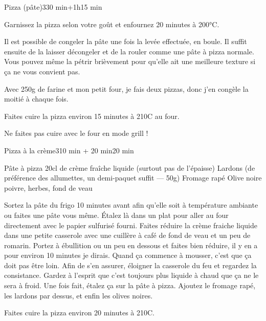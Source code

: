 \begin{recette}{Pizza (pâte)}{3}{30 min+1h}{15 min}
\begin{preparation}
\etape Garnissez la pizza selon votre goût et enfournez 20 minutes à 200°C.
\end{preparation}

\begin{remarque}
Il est possible de congeler la pâte une fois la levée effectuée, en boule. Il suffit ensuite de la laisser décongeler et de la rouler comme une pâte à pizza normale. Vous pouvez même la pétrir brièvement pour qu'elle ait une meilleure texture si ça ne vous convient pas.

Avec 250g de farine et mon petit four, je fais deux pizzas, donc j'en congèle la moitié à chaque fois.
\end{remarque}


\begin{cuisson}
Faites cuire la pizza environ 15 minutes à 210\degres C au four.

\begin{attention}
Ne faites pas cuire avec le four en mode grill !
\end{attention}

\end{cuisson}


\end{recette}

\begin{recette}{Pizza à la crème}{3}{10 min + 20 min}{20 min}
\begin{ingredients}
\ingredient Pâte à pizza
\ingredient 20cl de crème fraîche liquide (surtout pas de l'épaisse)
\ingredient Lardons (de préférence des allumettes, un demi-paquet suffit --- 50g)
\ingredient Fromage rapé
\ingredient Olive noire
\ingredient poivre, herbes, fond de veau
\end{ingredients}

\begin{preparation}
\etape Sortez la pâte du frigo 10 minutes avant afin qu'elle soit à température ambiante ou faites une pâte vous même.
\etape Étalez là dans un plat pour aller au four directement avec le papier sulfurisé fourni.
\etape Faites réduire la crème fraiche liquide dans une petite casserole avec une cuillère à café de fond de veau et un peu de romarin. Portez à ébullition ou un peu en dessous et faites bien réduire, il y en a pour environ 10 minutes je dirais. Quand ça commence à mousser, c'est que ça doit pas être loin. Afin de s'en assurer, éloigner la casserole du feu et regardez la consistance. Gardez à l'esprit que c'est toujours plus liquide à chaud que ça ne le sera à froid.
\etape Une fois fait, étalez ça sur la pâte à pizza. Ajoutez le fromage rapé, les lardons par dessus, et enfin les olives noires.
\end{preparation}

\begin{cuisson}
Faites cuire la pizza environ 20 minutes à 210\degres C.
\end{cuisson}


\end{recette}

